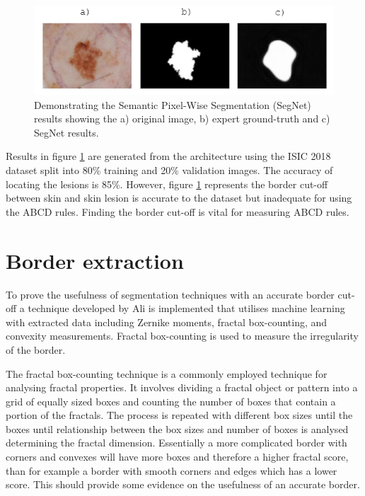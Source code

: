 \begin{figure}[hb]
\centering
\includegraphics[scale=1.2]{images/border-seg.png}
\caption{Demonstrating the Semantic Pixel-Wise Segmentation (SegNet) results showing the a) original image, b) expert ground-truth and c) SegNet results.} \label{SegNet}
\end{figure}

Results in figure \ref{SegNet} are generated from the architecture using the ISIC 2018 dataset split into 80\% training and 20\% validation images. The accuracy of locating the lesions is 85\%. However, figure \ref{SegNet} represents the border cut-off between skin and skin lesion is accurate to the dataset but inadequate for using the ABCD rules. Finding the border cut-off is vital for measuring ABCD rules\cite{Pereira2020}.

\section{Border extraction}
To prove the usefulness of segmentation techniques with an accurate border cut-off a technique developed by Ali\cite{Ali2020b} is implemented that utilises machine learning with extracted data including Zernike moments, fractal box-counting, and convexity measurements. Fractal box-counting is used to measure the irregularity of the border.

The fractal box-counting technique is a commonly employed technique for analysing fractal properties. It involves dividing a fractal object or pattern into a grid of equally sized boxes and counting the number of boxes that contain a portion of the fractals. The process is repeated with different box sizes until the boxes until relationship between the box sizes and number of boxes is analysed determining the fractal dimension\cite{Hamburger1996}. Essentially a more complicated border with corners and convexes will have more boxes and therefore a higher fractal score, than for example a border with smooth corners and edges which has a lower score. This should provide some evidence on the usefulness of an accurate border.

